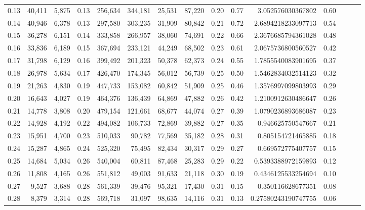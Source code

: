 \begin{tabular}{rrrrrrrrrrrrrrr}
0.13 &  40,411 &  5,875 &  0.13 &  256,634 &  344,181 &   25,531 &   87,220 &  0.20 &  0.77 &       3.052576030367802 &      0.60 \\
0.14 &  40,946 &  6,378 &  0.13 &  297,580 &  303,235 &   31,909 &   80,842 &  0.21 &  0.72 &      2.6894218233097713 &      0.54 \\
0.15 &  36,278 &  6,151 &  0.14 &  333,858 &  266,957 &   38,060 &   74,691 &  0.22 &  0.66 &      2.3676685794361028 &      0.48 \\
0.16 &  33,836 &  6,189 &  0.15 &  367,694 &  233,121 &   44,249 &   68,502 &  0.23 &  0.61 &      2.0675736800560527 &      0.42 \\
0.17 &  31,798 &  6,129 &  0.16 &  399,492 &  201,323 &   50,378 &   62,373 &  0.24 &  0.55 &      1.7855540083901695 &      0.37 \\
0.18 &  26,978 &  5,634 &  0.17 &  426,470 &  174,345 &   56,012 &   56,739 &  0.25 &  0.50 &      1.5462834032514123 &      0.32 \\
0.19 &  21,263 &  4,830 &  0.19 &  447,733 &  153,082 &   60,842 &   51,909 &  0.25 &  0.46 &      1.3576997099803993 &      0.29 \\
0.20 &  16,643 &  4,027 &  0.19 &  464,376 &  136,439 &   64,869 &   47,882 &  0.26 &  0.42 &      1.2100912630486647 &      0.26 \\
0.21 &  14,778 &  3,808 &  0.20 &  479,154 &  121,661 &   68,677 &   44,074 &  0.27 &  0.39 &      1.0790236893686087 &      0.23 \\
0.22 &  14,928 &  4,192 &  0.22 &  494,082 &  106,733 &   72,869 &   39,882 &  0.27 &  0.35 &       0.946625750547667 &      0.21 \\
0.23 &  15,951 &  4,700 &  0.23 &  510,033 &   90,782 &   77,569 &   35,182 &  0.28 &  0.31 &       0.805154721465885 &      0.18 \\
0.24 &  15,287 &  4,865 &  0.24 &  525,320 &   75,495 &   82,434 &   30,317 &  0.29 &  0.27 &       0.669572775407757 &      0.15 \\
0.25 &  14,684 &  5,034 &  0.26 &  540,004 &   60,811 &   87,468 &   25,283 &  0.29 &  0.22 &      0.5393388972159893 &      0.12 \\
0.26 &  11,808 &  4,165 &  0.26 &  551,812 &   49,003 &   91,633 &   21,118 &  0.30 &  0.19 &      0.4346125533254694 &      0.10 \\
0.27 &   9,527 &  3,688 &  0.28 &  561,339 &   39,476 &   95,321 &   17,430 &  0.31 &  0.15 &       0.350116628677351 &      0.08 \\
0.28 &   8,379 &  3,314 &  0.28 &  569,718 &   31,097 &   98,635 &   14,116 &  0.31 &  0.13 &     0.27580243190747755 &      0.06 \\

\end{tabular}
